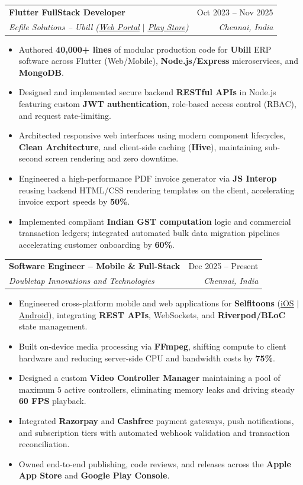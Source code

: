 \documentclass[letterpaper,10pt]{article}
\makeatletter
\newcommand{\resumeItem}[1]{
  \item\small{
    {#1 \vspace{-2pt}}
  }
}
\newcommand{\resumeSubheading}[4]{
  \vspace{-2pt}\item
    \begin{tabular*}{0.97\textwidth}[t]{l@{\extracolsep{\fill}}r}
      \textbf{#1} & #2 \\
      \textit{\small#3} & \textit{\small #4} \\
    \end{tabular*}\vspace{-6pt}
}
\newcommand{\resumeItemListStart}{\begin{itemize}}
\newcommand{\resumeItemListEnd}{\end{itemize}\vspace{-5pt}}
\makeatother
\begin{document}
    \resumeSubheading
      {Flutter FullStack Developer}{Oct 2023 -- Nov 2025}
      {Ecfile Solutions -- Ubill (\href{https://app.ubill.tech/}{\underline{Web Portal}} $|$ \href{https://play.google.com/store/apps/details?id=com.ubill.tech}{\underline{Play Store}})}{Chennai, India}
      \resumeItemListStart
        \resumeItem{Authored \textbf{40,000+ lines} of modular production code for \textbf{Ubill} ERP software across Flutter (Web/Mobile), \textbf{Node.js/Express} microservices, and \textbf{MongoDB}.}
        \resumeItem{Designed and implemented secure backend \textbf{RESTful APIs} in Node.js featuring custom \textbf{JWT authentication}, role-based access control (RBAC), and request rate-limiting.}
        \resumeItem{Architected responsive web interfaces using modern component lifecycles, \textbf{Clean Architecture}, and client-side caching (\textbf{Hive}), maintaining sub-second screen rendering and zero downtime.}
        \resumeItem{Engineered a high-performance PDF invoice generator via \textbf{JS Interop} reusing backend HTML/CSS rendering templates on the client, accelerating invoice export speeds by \textbf{50\%}.}
        \resumeItem{Implemented compliant \textbf{Indian GST computation} logic and commercial transaction ledgers; integrated automated bulk data migration pipelines accelerating customer onboarding by \textbf{60\%}.}
      \resumeItemListEnd

    \resumeSubheading
      {Software Engineer -- Mobile \& Full-Stack}{Dec 2025 -- Present}
      {Doubletap Innovations and Technologies}{Chennai, India}
      \resumeItemListStart
        \resumeItem{Engineered cross-platform mobile and web applications for \textbf{Selfitoons} (\href{https://apps.apple.com/in/app/selfitoons/id6758597947}{\underline{iOS}} $|$ \href{https://play.google.com/store/apps/details?id=com.doubletap.ai.selfitoons}{\underline{Android}}), integrating \textbf{REST APIs}, WebSockets, and \textbf{Riverpod/BLoC} state management.}
        \resumeItem{Built on-device media processing via \textbf{FFmpeg}, shifting compute to client hardware and reducing server-side CPU and bandwidth costs by \textbf{75\%}.}
        \resumeItem{Designed a custom \textbf{Video Controller Manager} maintaining a pool of maximum 5 active controllers, eliminating memory leaks and driving steady \textbf{60 FPS} playback.}
        \resumeItem{Integrated \textbf{Razorpay} and \textbf{Cashfree} payment gateways, push notifications, and subscription tiers with automated webhook validation and transaction reconciliation.}
        \resumeItem{Owned end-to-end publishing, code reviews, and releases across the \textbf{Apple App Store} and \textbf{Google Play Console}.}
      \resumeItemListEnd
\end{document}
